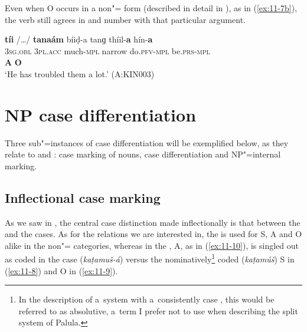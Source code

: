 Even when O occurs in a non"= form (described in detail in ), as in (\ref{ex:11-7b}), the verb still agrees in  and number with that particular   argument.

\begin{exe}
\ex
\label{ex:11-7b}
\glll \textbf{tíi} /{\ldots}/ \textbf{tanaám} bíiḍ-a tanɡ thíil-\textbf{a} hín-\textbf{a} \\
\textsc{3sg.obl} {} \textsc{3pl.acc} much-\textsc{mpl} narrow do.\textsc{pfv}-\textsc{mpl} be.\textsc{prs}-\textsc{mpl} \\
\textbf{A} {} \textbf{O} \\
\glt `He has troubled them a lot.' (A:KIN003)
\end{exe}


\section{NP case differentiation}
\label{sec:11-2}

Three sub"=instances of case differentiation will be exemplified below, as they relate to  and :  case marking of nouns,  case differentiation and NP"=internal marking.


\subsection{Inflectional case marking}
\label{subsec:11-2-1}


As we saw in , the central case distinction made inflectionally is that between the  and the  cases. As for the relations we are interested in, the  is used for S, A and O alike in the non"= categories, whereas in the , A, as in (\ref{ex:11-10}), is singled out as coded in the  case (\textit{kaṭamuš-á}) versus the nominatively\footnote{In the description of a~system with a~consistently  case , this would be referred to as absolutive, a~term I prefer not to use when describing the split  system of Palula.} coded (\textit{kaṭamúš}) S in (\ref{ex:11-8}) and O in (\ref{ex:11-9}).

